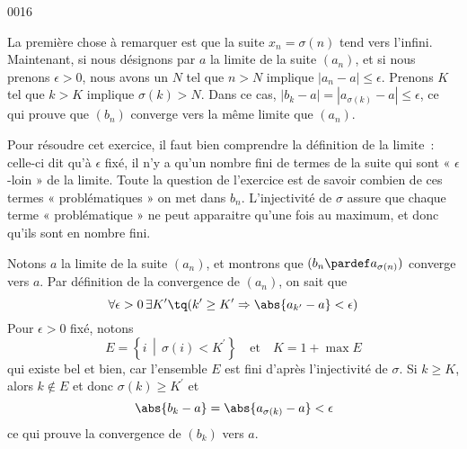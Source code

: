 
\begin{corrige}{0016}

La première chose à remarquer est que la suite $x_n=\sigma(n)$ tend vers l'infini. Maintenant, si nous désignons par $a$ la limite de la suite $(a_n)$, et si nous prenons $\epsilon>0$, nous avons un $N$ tel que $n>N$ implique $| a_n-a |\leq\epsilon$. Prenons $K$ tel que $k>K$ implique $\sigma(k)>N$. Dans ce cas, $| b_k-a |=| a_{\sigma(k)}-a |\leq\epsilon$, ce qui prouve que $(b_n)$ converge vers la même limite que $(a_n)$.


\begin{alternative}

\begin{remark}
  Pour résoudre cet exercice, il faut bien comprendre la définition de la limite~: celle-ci dit qu'à $\epsilon$ fixé, il n'y a qu'un nombre fini de termes de la suite qui sont « $\epsilon$-loin » de la limite. Toute la question de l'exercice est de savoir combien de ces termes « problématiques » on met dans $b_n$. L'injectivité de $\sigma$ assure que chaque terme « problématique » ne peut apparaitre qu'une fois au maximum, et donc qu'ils sont en nombre fini.
\end{remark}

Notons $a$ la limite de la suite $(a_n)$, et montrons que
$(b_n \pardef a_{\sigma(n)})$ converge vers $a$. Par définition de la
convergence de $(a_n)$, on sait que
\begin{equation*}
  \forall \epsilon > 0\, \exists K^\prime \tq (k^\prime \geq K^\prime \Rightarrow \abs{a_{k^\prime} - a} < \epsilon)
\end{equation*}
Pour $\epsilon > 0$ fixé, notons
\begin{equation*}
  E = \left\{ i \,\middle\vert\, \sigma(i) < K^\prime \right\}
  \quad\text{et}\quad K = 1 + \max E
\end{equation*}
qui existe bel et bien, car l'ensemble $E$ est fini d'après
l'injectivité de $\sigma$. Si $k \geq K$, alors $k \not\in E$ et donc
$\sigma(k) \geq K^\prime$ et
\begin{equation*}
  \abs{b_k - a} = \abs{a_{\sigma(k)} - a} < \epsilon
\end{equation*}
ce qui prouve la convergence de $(b_k)$ vers $a$.
\end{alternative}

\end{corrige}
